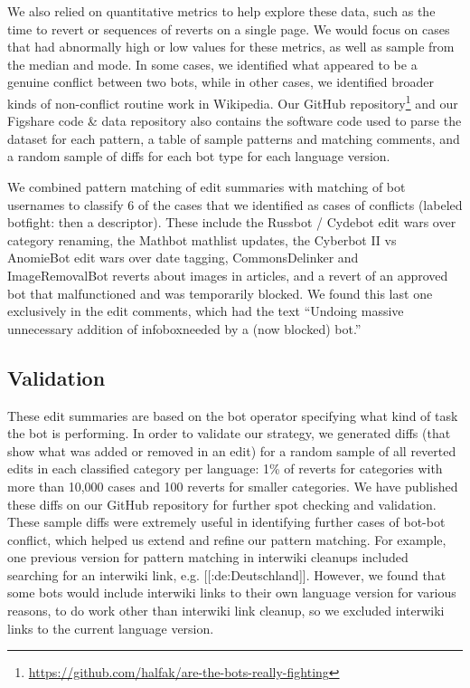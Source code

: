 \documentclass[format=acmsmall, review=false, screen=true]{acmart}%
\begin{document}
We also relied on quantitative metrics to help explore these data, such as the time to revert or sequences of reverts on a single page. We would focus on cases that had abnormally high or low values for these metrics, as well as sample from the median and mode. In some cases, we identified what appeared to be a genuine conflict between two bots, while in other cases, we identified broader kinds of non-conflict routine work in Wikipedia. Our GitHub repository\footnote{ \url{https://github.com/halfak/are-the-bots-really-fighting}} and our Figshare code \& data repository \cite{figshare} also contains the software code used to parse the dataset for each pattern, a table of sample patterns and matching comments, and a random sample of diffs for each bot type for each language version.

We combined pattern matching of edit summaries with matching of bot usernames to classify 6 of the cases that we identified as cases of conflicts (labeled botfight: then a descriptor). These include the Russbot / Cydebot edit wars over category renaming, the Mathbot mathlist updates, the Cyberbot II vs AnomieBot edit wars over date tagging, CommonsDelinker and ImageRemovalBot reverts about images in articles, and a revert of an approved bot that malfunctioned and was temporarily blocked. We found this last one exclusively in the edit comments, which had the text ``Undoing massive unnecessary addition of infoboxneeded by a (now blocked) bot.'' 

\subsection{Validation} \label{s:coding:validation}
These edit summaries are based on the bot operator specifying what kind of task the bot is performing. In order to validate our strategy, we generated diffs (that show what was added or removed in an edit) for a random sample of all reverted edits in each classified category per language: 1\% of reverts for categories with more than 10,000 cases and 100 reverts for smaller categories. We have published these diffs on our GitHub repository for further spot checking and validation. These sample diffs were extremely useful in identifying further cases of bot-bot conflict, which helped us extend and refine our pattern matching. For example, one previous version for pattern matching in interwiki cleanups included searching for an interwiki link, e.g. [[:de:Deutschland]]. However, we found that some bots would include interwiki links to their own language version for various reasons, to do work other than interwiki link cleanup, so we excluded interwiki links to the current language version. 
\end{document}
